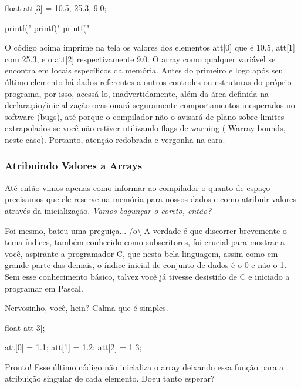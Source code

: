 \begin{ccode}
  float att[3] = {10.5, 25.3, 9.0};

  printf("%
  printf("%
  printf("%
\end{ccode}

O código acima imprime na tela os valores dos elementos att[0] que é 10.5,
att[1] com 25.3, e o att[2] respectivamente 9.0. O array como qualquer variável
se encontra em locais específicos da memória. Antes do primeiro e logo após seu
último elemento há dados referentes a outros controles ou estruturas do próprio
programa, por isso, acessá-lo, inadvertidamente, além da área definida na
declaração/inicialização ocasionará seguramente comportamentos inesperados no
software (bugs), até porque o compilador não o avisará de plano sobre limites
extrapolados se você não estiver utilizando flags de warning (-Warray-bounds,
neste caso). Portanto, atenção redobrada e vergonha na cara.

\subsubsection{Atribuindo Valores a Arrays}
Até então vimos apenas como informar ao compilador o quanto de espaço
precisamos que ele reserve na memória para nossos dados e como atribuir valores
através da inicialização. \textit{Vamos bagunçar o coreto, então?}


Foi mesmo, bateu uma preguiça... /o{\textbackslash} A verdade é que discorrer
brevemente o tema índices, também conhecido como subscritores, foi crucial para
mostrar a você, aspirante a programador C, que nesta bela linguagem, assim como
em grande parte das demais, o índice inicial de conjunto de dados é o 0 e não o
1. Sem esse conhecimento básico, talvez você já tivesse desistido de C e
iniciado a programar em Pascal.


Nervosinho, você, hein? Calma que é simples.

\begin{ccode}
  float att[3];

  att[0] = 1.1;
  att[1] = 1.2;
  att[2] = 1.3;
\end{ccode}

Pronto! Esse último código não inicializa o array deixando essa função para a
atribuição singular de cada elemento. Doeu tanto esperar?


